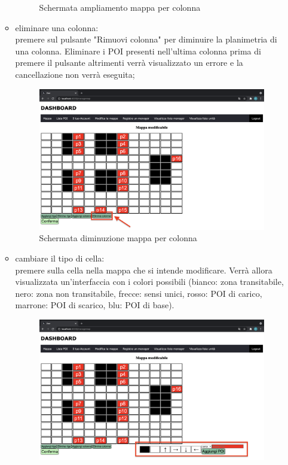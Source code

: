 \begin{itemize}
\begin{itemize}
\begin{figure}[H]
                \caption{Schermata ampliamento mappa per colonna}
            \end{figure}
            \item eliminare una colonna: \\premere sul pulsante "Rimuovi colonna" per diminuire la planimetria di una colonna. Eliminare i POI presenti nell'ultima colonna prima di premere il pulsante altrimenti verrà visualizzato un errore e la cancellazione non verrà eseguita;
            \begin{figure}[H]
                \centering
                \includegraphics[scale=0.12]{res/images/modificamappa4.png}
                \caption{Schermata diminuzione mappa per colonna}
            \end{figure}
            \item cambiare il tipo di cella: \\premere sulla cella nella mappa che si intende modificare. Verrà allora visualizzata un'interfaccia con i colori possibili (bianco: zona transitabile, nero: zona non transitabile, frecce: sensi unici, rosso: POI di carico, marrone: POI di scarico, blu: POI di base). 
            \begin{figure}[H]
                \centering
                \includegraphics[scale=0.12]{res/images/modificamappa5.png}

\end{figure}
\end{itemize}
\end{itemize}

